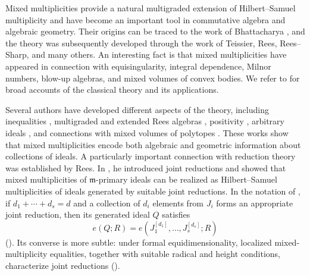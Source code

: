 \documentclass[reqno,12pt]{amsart}
\theoremstyle{plain}
\theoremstyle{definition}
\theoremstyle{remark}
\numberwithin{equation}{section}
\begin{document}
Mixed multiplicities provide a natural multigraded extension of
Hilbert--Samuel multiplicity and have become an important tool in
commutative algebra and algebraic geometry. Their origins can be traced
to the work of Bhattacharya \cite{Bhattacharya1957}, and the theory was
subsequently developed through the work of Teissier, Rees, Rees--Sharp,
and many others. An interesting fact is that mixed multiplicities have appeared in connection with
equisingularity, integral dependence, Milnor numbers, blow-up algebras,
and mixed volumes of convex bodies. We refer to
\cite{TrungVermaSurvey,SwansonHuneke} for broad accounts of the
classical theory and its applications.

Several authors have developed different aspects of the theory, including
inequalities \cite{ReesSharp1978}, multigraded and extended Rees
algebras \cite{KatzVerma1989}, positivity \cite{Trung2001}, arbitrary
ideals \cite{Viet2000}, and connections with mixed volumes of polytopes
\cite{TrungVerma2007}. These works show that mixed multiplicities encode
both algebraic and geometric information about collections of ideals. A particularly important connection with reduction theory was
established by Rees. In \cite{Rees1984}, he introduced joint reductions
and showed that mixed multiplicities of $\mathfrak m$-primary ideals can
be realized as Hilbert--Samuel multiplicities of ideals generated by
suitable joint reductions. In the notation of
\cite[Chapter~17]{SwansonHuneke}, if $d_1+\cdots+d_s=d$ and a collection
of $d_i$ elements from $J_i$ forms an appropriate joint reduction, then
its generated ideal $Q$ satisfies
\[
e(Q;R)=e(J_1^{[d_1]},\ldots,J_s^{[d_s]};R)
\]
(\cite[Theorem~17.4.9]{SwansonHuneke}). Its converse is more subtle: under
formal equidimensionality, localized mixed-multiplicity equalities,
together with suitable radical and height conditions, characterize
joint reductions (\cite[Theorem~17.6.1]{SwansonHuneke}).
\end{document}
